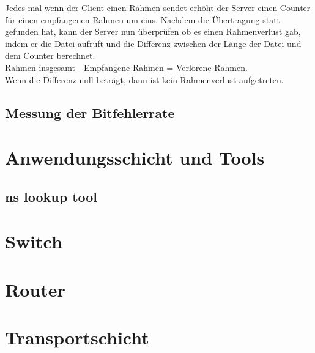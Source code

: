 \documentclass{scrartcl}
\begin{document}
  Jedes mal wenn der Client einen Rahmen sendet erhöht der Server einen Counter für einen empfangenen Rahmen um eins. Nachdem die Übertragung statt gefunden hat, kann der Server nun überprüfen ob es einen Rahmenverlust gab, indem er die Datei aufruft und die Differenz zwischen der Länge der Datei und dem Counter berechnet. \\
Rahmen insgesamt - Empfangene  Rahmen = Verlorene Rahmen.\\
Wenn die Differenz null beträgt, dann ist kein Rahmenverlust aufgetreten.

  \subsection[Aufgabe 3 Messung der Bitfehlerrate]{Messung der Bitfehlerrate}
 
 
  \newpage
\section[Versuch 3 Anwendungsschicht und Tools]{Anwendungsschicht und Tools}

  \subsection[Aufgabe 4 ns lookup tool]{ns lookup tool}


  \newpage
\section[Versuch 4 Switch]{Switch}


  \newpage
\section[Versuch 5 Router]{Router}
 
 
  \newpage
\section[Versuch 6 Transportschicht]{Transportschicht}
  
\end{document}
